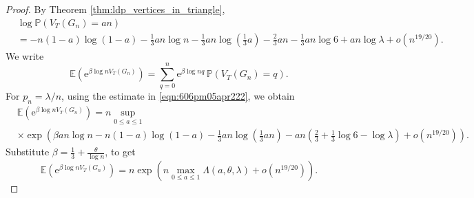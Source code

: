 \documentclass[bj,authoryear,noshowframe]{imsart}
\numberwithin{equation}{section}
\theoremstyle{plain}
\theoremstyle{definition}
\newcommand{\e}{{\mathrm e}}
\begin{document}
\begin{proof} 
By Theorem \ref{thm:ldp_vertices_in_triangle}, 
	\begin{equation}
	\label{eqn:606pm05apr222}
	\begin{aligned}
	&\log{\mathbb{P}(V_{ T}(G_n) = an)} \\
	& = -n(1-a) \log(1-a) - \tfrac13 an \log{n}- \tfrac13 an \log(\tfrac13a) 
	- \tfrac23 an -\tfrac13 an \log{6}+an\log{\lambda} +o(n^{19/20}).
	\end{aligned}
	\end{equation}
We write
\begin{equation*}
\mathbb{E}\left(\e^{\beta \log{n} V_{T}(G_n)}\right) = \sum_{q=0}^n \e^{\beta \log{n} q} \,
\mathbb{P}\left(V_{T}(G_n)=q\right).
\end{equation*}
For $p_n = \lambda/n$, using the estimate in \eqref{eqn:606pm05apr222}, we obtain 
\begin{equation}
\label{eqn:wednov22602pm}
\begin{aligned}
&\mathbb{E}\left(\e^{\beta \log{n} V_{T}(G_n)}\right) =  n\sup_{0\leq a\leq 1}\\
&\times \exp\left({\beta an\log{n} -n(1-a) \log(1-a) - \tfrac13 an \log(\tfrac13 an) 
- an (\tfrac23  +\tfrac13 \log{6}- \log{\lambda}) + o(n^{19/20})}\right).
\end{aligned}
\end{equation} 
Substitute $\beta= \tfrac{1}{3}+\frac{\theta}{\log{n}}$, to get
\begin{equation}
\mathbb{E}\left(\e^{\beta \log{n} V_{T}(G_n)}\right) 
= n \exp\left(n\max_{0\leq a\leq 1}\Lambda(a,\theta,\lambda) + o(n^{19/20})\right).
\end{equation}
\end{proof}
\end{document}
